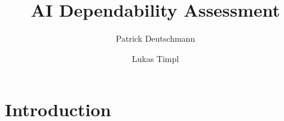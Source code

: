 \documentclass[acmsmall,nonacm]{acmart}
\begin{document}

\title{AI Dependability Assessment} %


\author{Patrick Deutschmann}

\author{Lukas Timpl}


\begin{abstract}
\end{abstract}


\maketitle

\tableofcontents


\section{Introduction}
\end{document}
